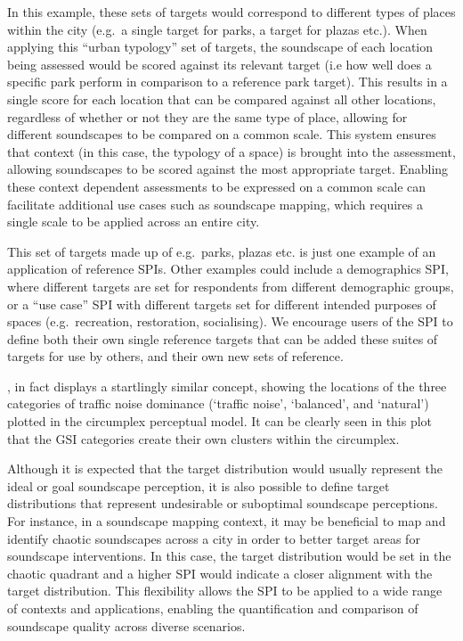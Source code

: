 \documentclass[
  authoryear,
  preprint,
  1p]{elsarticle}
\begin{document}
In this example, these sets of targets would correspond to different
types of places within the city (e.g.~a single target for parks, a
target for plazas etc.). When applying this ``urban typology'' set of
targets, the soundscape of each location being assessed would be scored
against its relevant target (i.e how well does a specific park perform
in comparison to a reference park target). This results in a single
score for each location that can be compared against all other
locations, regardless of whether or not they are the same type of place,
allowing for different soundscapes to be compared on a common scale.
This system ensures that context (in this case, the typology of a space)
is brought into the assessment, allowing soundscapes to be scored
against the most appropriate target. Enabling these context dependent
assessments to be expressed on a common scale can facilitate additional
use cases such as soundscape mapping, which requires a single scale to
be applied across an entire city.

This set of targets made up of e.g.~parks, plazas etc. is just one
example of an application of reference SPIs. Other examples could
include a demographics SPI, where different targets are set for
respondents from different demographic groups, or a ``use case'' SPI
with different targets set for different intended purposes of spaces
(e.g.~recreation, restoration, socialising). We encourage users of the
SPI to define both their own single reference targets that can be added
these suites of targets for use by others, and their own new sets of
reference.

\citep[Fig.6]{Kogan2018Green}, in fact displays a startlingly similar
concept, showing the locations of the three categories of traffic noise
dominance (`traffic noise', `balanced', and `natural') plotted in the
circumplex perceptual model. It can be clearly seen in this plot that
the GSI categories create their own clusters within the circumplex.

Although it is expected that the target distribution would usually
represent the ideal or goal soundscape perception, it is also possible
to define target distributions that represent undesirable or suboptimal
soundscape perceptions. For instance, in a soundscape mapping context,
it may be beneficial to map and identify chaotic soundscapes across a
city in order to better target areas for soundscape interventions. In
this case, the target distribution would be set in the chaotic quadrant
and a higher SPI would indicate a closer alignment with the target
distribution. This flexibility allows the SPI to be applied to a wide
range of contexts and applications, enabling the quantification and
comparison of soundscape quality across diverse scenarios.
\end{document}
